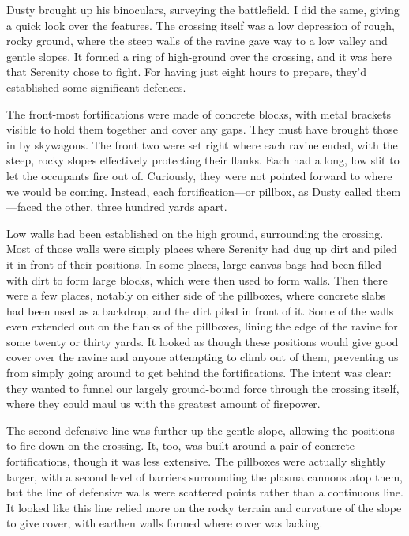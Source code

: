 Dusty brought up his binoculars, surveying the battlefield. I did the same, giving a quick look over the features. The crossing itself was a low depression of rough, rocky ground, where the steep walls of the ravine gave way to a low valley and gentle slopes. It formed a ring of high-ground over the crossing, and it was here that Serenity chose to fight. For having just eight hours to prepare, they’d established some significant defences.

The front-most fortifications were made of concrete blocks, with metal brackets visible to hold them together and cover any gaps. They must have brought those in by skywagons. The front two were set right where each ravine ended, with the steep, rocky slopes effectively protecting their flanks. Each had a long, low slit to let the occupants fire out of. Curiously, they were not pointed forward to where we would be coming. Instead, each fortification—or pillbox, as Dusty called them—faced the other, three hundred yards apart.

Low walls had been established on the high ground, surrounding the crossing. Most of those walls were simply places where Serenity had dug up dirt and piled it in front of their positions. In some places, large canvas bags had been filled with dirt to form large blocks, which were then used to form walls. Then there were a few places, notably on either side of the pillboxes, where concrete slabs had been used as a backdrop, and the dirt piled in front of it. Some of the walls even extended out on the flanks of the pillboxes, lining the edge of the ravine for some twenty or thirty yards. It looked as though these positions would give good cover over the ravine and anyone attempting to climb out of them, preventing us from simply going around to get behind the fortifications. The intent was clear: they wanted to funnel our largely ground-bound force through the crossing itself, where they could maul us with the greatest amount of firepower.

The second defensive line was further up the gentle slope, allowing the positions to fire down on the crossing. It, too, was built around a pair of concrete fortifications, though it was less extensive. The pillboxes were actually slightly larger, with a second level of barriers surrounding the plasma cannons atop them, but the line of defensive walls were scattered points rather than a continuous line. It looked like this line relied more on the rocky terrain and curvature of the slope to give cover, with earthen walls formed where cover was lacking.

